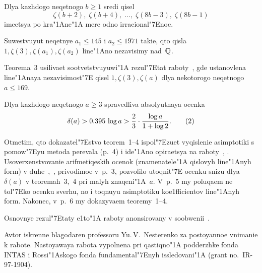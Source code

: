 \cyri
Dlya kazhdogo neqetnogo $b\ge1$ sredi qisel
$$
\zeta(b+2), \; \zeta(b+4), \; \dots, \; \zeta(8b-3), \; \zeta(8b-1)
$$
imeet\hbox{s}ya po kra\char"1Ane\char"1A{}
mere odno irracional\char"7Enoe.
\endproclaim

\cyri
Suwestvuyut neqetnye $a_1\le145$ i $a_2\le1971$ takie\rom,
qto qisla $1,\zeta(3),\zeta(a_1),\zeta(a_2)$
line\char"1Ano nezavisimy nad~$\Bbb Q$.
\endproclaim\cyrm

Teorema~3 usilivaet sootvet\hbox{s}tvuyuwi\char"1A{}
rezul\char"7Etat raboty~\cite{R2},
gde usta\-novlena line\char"1Anaya nezavisimost\char"7E{} qisel
$1,\zeta(3),\zeta(a)$ dlya nekotorogo neqetnogo $a\le169$.

\cyri
Dlya kazhdogo neqetnogo $a\ge3$ spravedliva absolyutnaya ocenka
$$
\delta(a)>0.395\,\log a>\frac23\cdot\frac{\log a}{1+\log2}.
\tag2
$$
\endproclaim\cyrm

Otmetim, qto dokazatel\char"7Estvo teorem~1--4 ispol\char"7Ezuet
vyqislenie asimptotiki s pomow\char"7Eyu metoda perevala
(p.~4) i ide\char"1Ano opiraet\hbox{s}ya na raboty~\cite{N2}, \cite{He}.
Usoverxenstvovanie arifmetiqeskih ocenok (znamenatele\char"1A{}
qislovyh line\char"1Anyh form) v duhe~\cite{H2},~\cite{RV},
privodimoe v~p.~3, pozvolilo utoqnit\char"7E{} ocenku snizu dlya $\delta(a)$
v teoremah~3,~4 pri malyh znaqeni\char"1A~$a$. V~p.~5 my po\-luqaem
ne tol\char"7Eko ocenku sverhu, no i toqnuyu asimptotiku koe1fficientov
line\char"1Anyh form. Nakonec, v~p.~6 my dokazyvaem teoremy~1--4.

Osnovnye rezul\char"7Etaty e1to\char"1A{} raboty
anonsirovany v soobwenii~\cite{Z}.

\medskip
Avtor iskrenne blagodaren professoru Yu.\,V.~Nesterenko
za postoyannoe vnimanie k rabote.
Nastoyawaya rabota vypolnena pri qastiqno\char"1A{} podderzhke
fonda {\rm INTAS} i Rossi\char"1Askogo fonda
fundamental\char"7Enyh issledovani\char"1A{}
(grant \rm no.~IR-97-1904).

